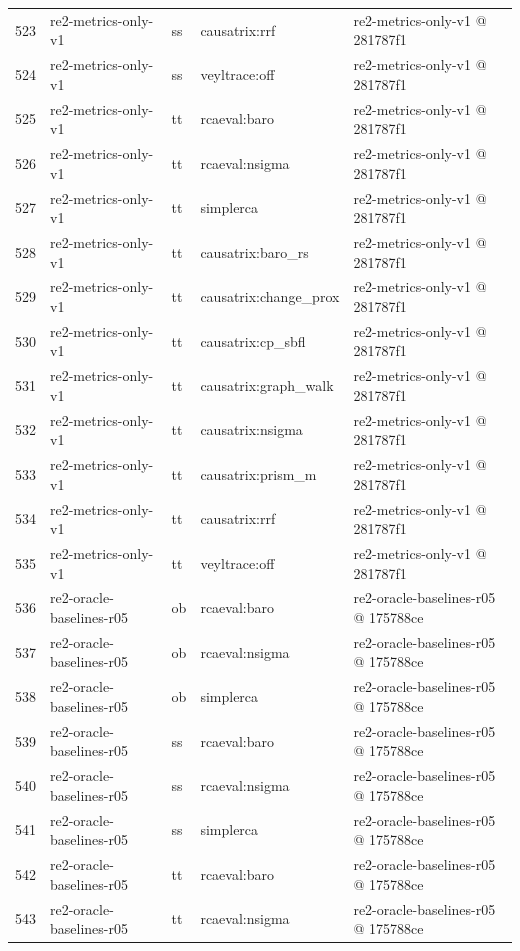 \begin{longtable}{@{}r>{\raggedright\arraybackslash}p{87.0pt}>{\raggedright\arraybackslash}p{18.0pt}>{\raggedright\arraybackslash}p{63.0pt}>{\raggedright\arraybackslash}p{108.0pt}@{}}
523 & re2-metrics-only-v1 & ss & causatrix:rrf & re2-metrics-only-v1 @ 281787f1 \\
524 & re2-metrics-only-v1 & ss & veyltrace:off & re2-metrics-only-v1 @ 281787f1 \\
525 & re2-metrics-only-v1 & tt & rcaeval:baro & re2-metrics-only-v1 @ 281787f1 \\
526 & re2-metrics-only-v1 & tt & rcaeval:nsigma & re2-metrics-only-v1 @ 281787f1 \\
527 & re2-metrics-only-v1 & tt & simplerca & re2-metrics-only-v1 @ 281787f1 \\
528 & re2-metrics-only-v1 & tt & causatrix:baro\_rs & re2-metrics-only-v1 @ 281787f1 \\
529 & re2-metrics-only-v1 & tt & causatrix:change\_prox & re2-metrics-only-v1 @ 281787f1 \\
530 & re2-metrics-only-v1 & tt & causatrix:cp\_sbfl & re2-metrics-only-v1 @ 281787f1 \\
531 & re2-metrics-only-v1 & tt & causatrix:graph\_walk & re2-metrics-only-v1 @ 281787f1 \\
532 & re2-metrics-only-v1 & tt & causatrix:nsigma & re2-metrics-only-v1 @ 281787f1 \\
533 & re2-metrics-only-v1 & tt & causatrix:prism\_m & re2-metrics-only-v1 @ 281787f1 \\
534 & re2-metrics-only-v1 & tt & causatrix:rrf & re2-metrics-only-v1 @ 281787f1 \\
535 & re2-metrics-only-v1 & tt & veyltrace:off & re2-metrics-only-v1 @ 281787f1 \\
536 & re2-oracle-baselines-r05 & ob & rcaeval:baro & re2-oracle-baselines-r05 @ 175788ce \\
537 & re2-oracle-baselines-r05 & ob & rcaeval:nsigma & re2-oracle-baselines-r05 @ 175788ce \\
538 & re2-oracle-baselines-r05 & ob & simplerca & re2-oracle-baselines-r05 @ 175788ce \\
539 & re2-oracle-baselines-r05 & ss & rcaeval:baro & re2-oracle-baselines-r05 @ 175788ce \\
540 & re2-oracle-baselines-r05 & ss & rcaeval:nsigma & re2-oracle-baselines-r05 @ 175788ce \\
541 & re2-oracle-baselines-r05 & ss & simplerca & re2-oracle-baselines-r05 @ 175788ce \\
542 & re2-oracle-baselines-r05 & tt & rcaeval:baro & re2-oracle-baselines-r05 @ 175788ce \\
543 & re2-oracle-baselines-r05 & tt & rcaeval:nsigma & re2-oracle-baselines-r05 @ 175788ce \\

\end{longtable}
